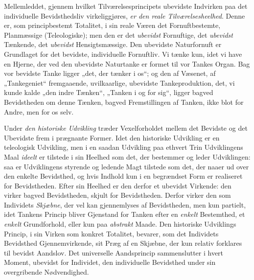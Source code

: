 \documentclass[12pt,a4paper,openany]{book}
\newcommand{\opage}[1]{\marginnote{\footnotesize\textit{[#1]}}}
\begin{document}
Mellemleddet, gjennem hvilket Tilværelsesprincipets ubevidste
Indvirken paa det individuelle Bevidsthedsliv virkeliggjøres,
\emph{er den reale Tilværelsesheelhed}. Denne er,
som principbestemt Totalitet, i sin reale Væren det Fornuftbestemte,
Planmæssige (Teleologiske); men den er det \emph{ubevidst}
Fornuftige, det \emph{ubevidst} Tænkende, det \emph{ubevidst} Hensigtsmæssige.
Den ubevidste Naturfornuft er Grundlaget for det
bevidste, individuelle Fornuftliv. Vi tænke kun, idet vi have
en Hjerne, der ved den ubevidste Naturtanke er formet til
\opage{55}vor Tankes Organ. Bag vor bevidste Tanke ligger „det,
der tænker i os“; og den af Væsenet, af „Tankegeniet“
fremgaaende, uvilkaarlige, ubevidste Tankeproduktion, det, vi
kunde kalde „den indre Tænken“, „Tanken i og for sig“,
ligger bagved Bevidstheden om denne Tænken, bagved Fremstillingen
af Tanken, ikke blot for Andre, men for os selv.

Under \emph{den historiske Udvikling} træder Vexelforholdet
mellem det Bevidste og det Ubevidste frem i prægnante
Former. Idet den historiske Udvikling er en teleologisk Udvikling,
men i en saadan Udvikling paa ethvert Trin Udviklingens
Maal \emph{ideelt} er tilstede i sin Heelhed som det, der
bestemmer og leder Udviklingen: saa er Udviklingens styrende
og ledende Magt tilstede som det, der naaer ud over den
enkelte Bevidsthed, og hvis Indhold kun i en begrændset Form
er realiseret for Bevidstheden. Efter sin Heelhed er den derfor
et ubevidst Virkende: den virker bagved Bevidstheden,
skjult for Bevidstheden. Derfor virker den som Individets
\emph{Skjæbne}, der vel kan gjennemlyses af Bevidstheden, men
kun partielt, idet Tankens Princip bliver Gjenstand for
Tanken efter en \emph{enkelt} Bestemthed, et \emph{enkelt} Grundforhold,
eller kun paa \emph{abstrakt} Maade. Den historiske Udviklings
Princip, i sin Virken som konkret Totalitet, bevarer, som det
Individets Bevidsthed Gjennemvirkende, sit Præg af en
Skjæbne, der kun relativ forklares til bevidst Aandslov.
Det universelle Aandsprincip sammenslutter i hvert Moment,
ubevidst for Individet, den individuelle Bevidsthed under sin
overgribende Nødvendighed.
\end{document}
